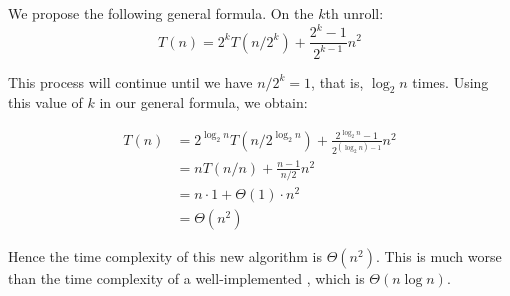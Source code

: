 \begin{prob}
\begin{subprobset}
\begin{subprob}
\begin{soln}
                We propose the following general formula. On the $k$th unroll:
                \[
                    T(n) = 2^k T(n/2^k) + \frac{2^{k}-1}{2^{k-1}}n^2
                \]

                This process will continue until we have $n/2^k = 1$, that is,
                $\log_2 n$ times. Using this value of $k$ in our general formula,
                we obtain:

                \begin{align*}
                    T(n) 
                        &=
                            2^{\log_2 n} T(n/2^{\log_2 n}) + \frac{2^{\log_2 n} - 1}{2^{(\log_2 n) - 1}} n^2\\
                        &=
                            n T(n/n) + \frac{n - 1}{n/2} n^2
                            \\
                        &= n \cdot 1 + \Theta(1) \cdot n^2
                            \\
                        &=
                            \Theta(n^2)
                \end{align*}

                Hence the time complexity of this new algorithm is $\Theta(n^2)$.
                This is much worse than the time complexity of a well-implemented
                , which is $\Theta(n \log n)$.
            \end{soln}
        \end{subprob}

    \end{subprobset}
\end{prob}

